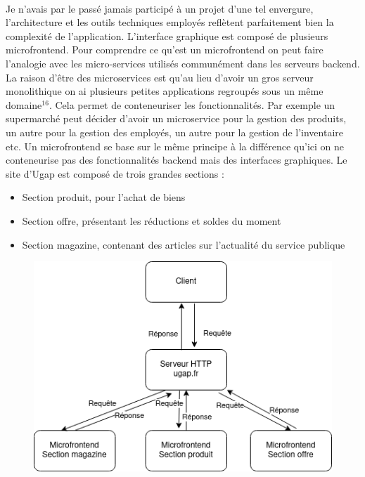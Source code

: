 \documentclass[12pt]{article}
\begin{document}
\begin {sloppypar}
\paragraph{}
Je n'avais par le passé jamais participé à un projet d'une tel envergure, l'architecture et les outils 
techniques employés reflètent parfaitement bien la complexité de l'application. L'interface graphique 
est composé de plusieurs microfrontend. Pour comprendre ce qu'est un microfrontend on peut faire 
l'analogie avec les micro-services utilisés communément dans les serveurs backend. La raison d'être 
des microservices est qu'au lieu d'avoir un gros serveur monolithique on ai plusieurs petites applications 
regroupés sous un même domaine$^{16}$. Cela permet de conteneuriser les fonctionnalités. Par exemple 
un supermarché peut décider d'avoir un microservice pour la gestion des produits, un autre pour la 
gestion des employés, un autre pour la gestion de l'inventaire etc. Un microfrontend se base sur le même 
principe à la différence qu'ici on ne conteneurise pas des fonctionnalités backend mais des interfaces 
graphiques.
\newpage
Le site d'Ugap est composé de trois grandes sections : 
\begin{itemize}
  \item 
    Section produit, pour l'achat de biens
  \item 
    Section offre, présentant les réductions et soldes du moment
  \item 
    Section magazine, contenant des articles sur l'actualité du service publique
\end{itemize}
\begin{figure}[h]
  \includegraphics[width=\textwidth] {archi_ugap.png}

\end{figure}
\end{sloppypar}
\end{document}
